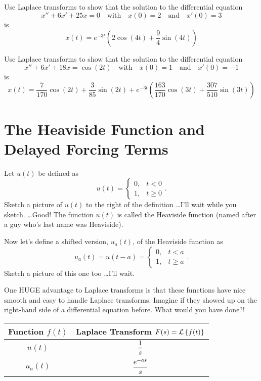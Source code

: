 \begin{problem}
    Use Laplace transforms to show that the solution to the differential equation
    \[ x'' + 6x' + 25x = 0 \quad \text{with} \quad x(0) = 2 \quad \text{and} \quad x'(0) =
    3 \]
    is
    \[ x(t) = e^{-3t} \left( 2 \cos(4t) + \frac{9}{4} \sin(4t) \right) \]
\end{problem}

\begin{problem}
    Use Laplace transforms to show that the solution to the differential equation
    \[ x'' + 6x' + 18x = \cos(2t) \quad \text{with} \quad x(0) = 1 \quad \text{and} \quad x'(0) =
    -1 \]
    is
    \[ x(t) = \frac{7}{170} \cos(2t) + \frac{3}{85} \sin(2t) + e^{-3t} \left(
        \frac{163}{170} \cos(3t) + \frac{307}{510} \sin(3t)
    \right) \]
\end{problem}




\section{The Heaviside Function and Delayed Forcing Terms}
\begin{problem}
    Let $u(t)$ be defined as
    \[ u(t) = \left\{ \begin{array}{ll} 0, & t<0 \\ 1, & t\ge 0 \end{array} \right. . \]
    Sketch a picture of $u(t)$ to the right of the definition \dots I'll wait while you
    sketch. \dots Good!  The function $u(t)$ is called the Heaviside function (named after a
    guy who's last name was Heaviside).  
\end{problem}



\begin{problem}
    Now let's define a shifted version, $u_a(t)$, of the Heaviside function as 
    \[ u_a(t) = u(t-a) = \left\{ \begin{array}{ll} 0, & t<a \\ 1, & t\ge a \end{array}
    \right. . \]
    Sketch a picture of this one too \dots I'll wait.
\end{problem}

One HUGE advantage to Laplace transforms is that these functions have nice smooth and easy
to handle Laplace transforms.  Imagine if they showed up on the right-hand side of a
differential equation before.  What would you have done?!
\begin{center}
    \setlength\extrarowheight{10pt}
    \begin{tabular}{|c|c|}
        \hline
        Function $f(t)$ & Laplace Transform $F(s) = \mathcal{L}\left\{ f(t) \right\}$ \\ \hline \hline
        $u(t)$ & $\displaystyle \frac{1}{s}$ \\
        $u_a(t)$ & $\displaystyle \frac{e^{-as}}{s}$ \\\hline
    \end{tabular}
\end{center}


